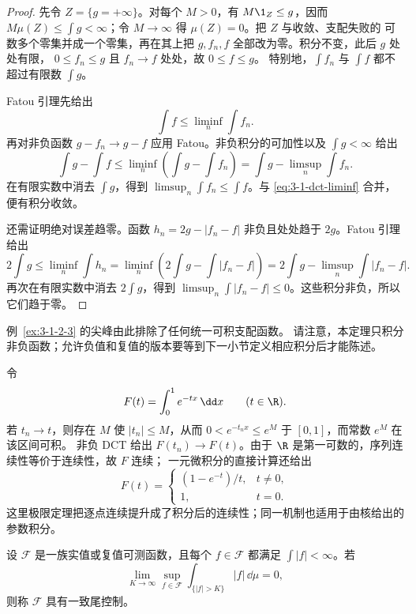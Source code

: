 \begin{proof}
先令 $Z=\{g=+\infty\}$。对每个 $M>0$，有 $M\1_Z\le g$，因而
$M\mu(Z)\le\int g<\infty$；令 $M\to\infty$ 得 $\mu(Z)=0$。把 $Z$ 与收敛、支配失败的
可数多个零集并成一个零集，再在其上把 $g,f_n,f$ 全部改为零。积分不变，此后 $g$ 处处有限，
$0\leq f_n\leq g$ 且 $f_n\to f$ 处处，故 $0\leq f\leq g$。
特别地，$\int f_n$ 与 $\int f$ 都不超过有限数 $\int g$。

Fatou 引理先给出
\[
 \int f\leq\liminf_n\int f_n.
 \tag{3.1.13}\label{eq:3-1-dct-liminf}
\]
再对非负函数 $g-f_n\to g-f$ 应用 Fatou。非负积分的可加性以及 $\int g<\infty$ 给出
\[
 \int g-\int f
 \leq\liminf_n\left(\int g-\int f_n\right)
 =\int g-\limsup_n\int f_n.
\]
在有限实数中消去 $\int g$，得到
$\limsup_n\int f_n\leq\int f$。与 \eqref{eq:3-1-dct-liminf} 合并，便有积分收敛。

还需证明绝对误差趋零。函数
$h_n=2g-|f_n-f|$ 非负且处处趋于 $2g$。Fatou 引理给出
\[
 2\int g
 \leq\liminf_n\int h_n
 =\liminf_n\left(2\int g-\int|f_n-f|\right)
 =2\int g-\limsup_n\int|f_n-f|.
\]
再次在有限实数中消去 $2\int g$，得到
$\limsup_n\int|f_n-f|\leq0$。这些积分非负，所以它们趋于零。
\end{proof}

例~\ref{ex:3-1-2-3} 的尖峰由此排除了任何统一可积支配函数。
请注意，本定理只积分非负函数；允许负值和复值的版本要等到下一小节定义相应积分后才能陈述。

\begin{example}[一次参数积分的回收计算]\label{ex:3-1-2-parameter}
令
\[
 F(t)=\int_0^1e^{-tx}\,\dd x\qquad(t\in\R).
\]
若 $t_n\to t$，则存在 $M$ 使 $|t_n|\leq M$，从而
$0<e^{-t_nx}\leq e^M$ 于 $[0,1]$，而常数 $e^M$ 在该区间可积。
非负 DCT 给出 $F(t_n)\to F(t)$。由于 $\R$ 是第一可数的，序列连续性等价于连续性，故 $F$ 连续；
一元微积分的直接计算还给出
\[
 F(t)=
 \begin{cases}
 (1-e^{-t})/t,&t\ne0,\\
 1,&t=0.
 \end{cases}
\]
这里极限定理把逐点连续提升成了积分后的连续性；同一机制也适用于由核给出的参数积分。
\end{example}

\begin{definition}[一致尾控制]\label{def:3-1-2-3}
设 $\mathcal F$ 是一族实值或复值可测函数，且每个 $f\in\mathcal F$ 都满足
$\int|f|<\infty$。若
\[
 \lim_{K\to\infty}\sup_{f\in\mathcal F}
 \int_{\{|f|>K\}}|f|\,\dd\mu=0,
 \tag{3.1.14}\label{eq:3-1-uniform-tail}
\]
则称 $\mathcal F$ 具有一致尾控制。
\end{definition}

